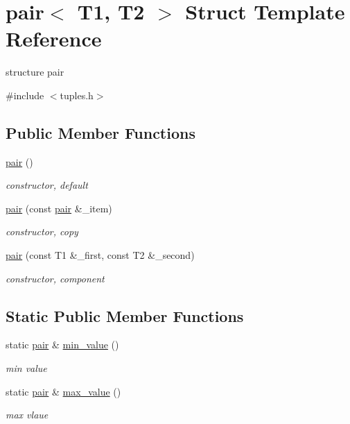 \hypertarget{structpair}{}\section{pair$<$ T1, T2 $>$ Struct Template Reference}
\label{structpair}


structure pair  




{\ttfamily \#include $<$tuples.\+h$>$}

\subsection*{Public Member Functions}
\begin{DoxyCompactItemize}
\item 
\hyperlink{structpair_a1dba17bb5c888d7ed8ce7b7c4acc52de}{pair} ()
\begin{DoxyCompactList}\small\item\em constructor, default \end{DoxyCompactList}\item 
\hyperlink{structpair_ab75f77e9a1f726301f66d3be6b1e184a}{pair} (const \hyperlink{structpair}{pair} \&\+\_\+item)
\begin{DoxyCompactList}\small\item\em constructor, copy \end{DoxyCompactList}\item 
\hyperlink{structpair_a5674a7a5327419692abe6160ae202859}{pair} (const T1 \&\+\_\+first, const T2 \&\+\_\+second)
\begin{DoxyCompactList}\small\item\em constructor, component \end{DoxyCompactList}\end{DoxyCompactItemize}
\subsection*{Static Public Member Functions}
\begin{DoxyCompactItemize}
\item 
static \hyperlink{structpair}{pair} \& \hyperlink{structpair_abca1ec29c5040ce16bd3993e80d42923}{min\+\_\+value} ()
\begin{DoxyCompactList}\small\item\em min value \end{DoxyCompactList}\item 
static \hyperlink{structpair}{pair} \& \hyperlink{structpair_a89b59c46e545a619e96c7bd5d66a8ef6}{max\+\_\+value} ()
\begin{DoxyCompactList}\small\item\em max vlaue \end{DoxyCompactList}\end{DoxyCompactItemize}
